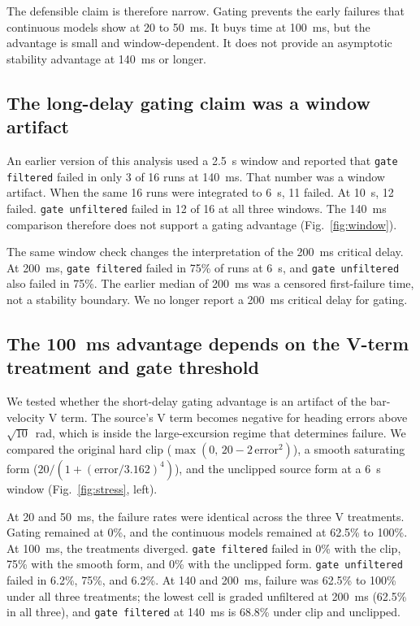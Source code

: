 \documentclass[pdflatex,sn-nature]{sn-jnl}
\begin{document}
The defensible claim is therefore narrow. Gating prevents the early failures that continuous models show at 20 to 50~ms. It buys time at 100~ms, but the advantage is small and window-dependent. It does not provide an asymptotic stability advantage at 140~ms or longer.

\subsection{The long-delay gating claim was a window artifact}

An earlier version of this analysis used a 2.5~s window and reported that \texttt{gate filtered} failed in only 3 of 16 runs at 140~ms. That number was a window artifact. When the same 16 runs were integrated to 6~s, 11 failed. At 10~s, 12 failed. \texttt{gate unfiltered} failed in 12 of 16 at all three windows. The 140~ms comparison therefore does not support a gating advantage (Fig.~\ref{fig:window}).

The same window check changes the interpretation of the 200~ms critical delay. At 200~ms, \texttt{gate filtered} failed in 75\% of runs at 6~s, and \texttt{gate unfiltered} also failed in 75\%. The earlier median of 200~ms was a censored first-failure time, not a stability boundary. We no longer report a 200~ms critical delay for gating.

\subsection{The 100~ms advantage depends on the V-term treatment and gate threshold}

We tested whether the short-delay gating advantage is an artifact of the bar-velocity V term. The source's V term becomes negative for heading errors above $\sqrt{10}$~rad, which is inside the large-excursion regime that determines failure. We compared the original hard clip ($\max(0,\,20-2\,\mathrm{error}^2)$), a smooth saturating form ($20/(1+(\mathrm{error}/3.162)^4)$), and the unclipped source form at a 6~s window (Fig.~\ref{fig:stress}, left).

At 20 and 50~ms, the failure rates were identical across the three V treatments. Gating remained at 0\%, and the continuous models remained at 62.5\% to 100\%. At 100~ms, the treatments diverged. \texttt{gate filtered} failed in 0\% with the clip, 75\% with the smooth form, and 0\% with the unclipped form. \texttt{gate unfiltered} failed in 6.2\%, 75\%, and 6.2\%. At 140 and 200~ms, failure was 62.5\% to 100\% under all three treatments; the lowest cell is graded unfiltered at 200~ms (62.5\% in all three), and \texttt{gate filtered} at 140~ms is 68.8\% under clip and unclipped.
\end{document}
